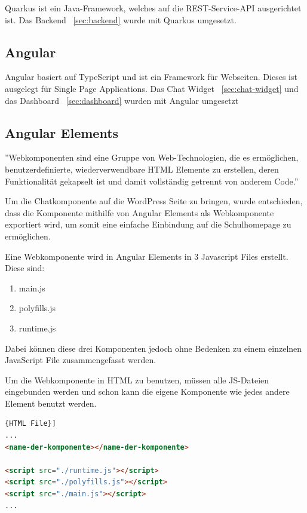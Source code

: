 Quarkus ist ein Java-Framework, welches auf die REST-Service-API ausgerichtet ist.
Das Backend ~\ref{sec:backend} wurde mit Quarkus umgesetzt.

\subsection{Angular}

Angular basiert auf TypeScript und ist ein Framework für Webseiten.
Dieses ist ausgelegt für Single Page Applications.
Das Chat Widget ~\ref{sec:chat-widget} und das Dashboard ~\ref{sec:dashboard} wurden mit Angular umgesetzt

\subsection{Angular Elements}\label{subsec:angular-elements}

''Webkomponenten sind eine Gruppe von Web-Technologien, die es ermöglichen, benutzerdefinierte, wiederverwendbare HTML Elemente zu erstellen, deren Funktionalität gekapselt ist und damit vollständig getrennt von anderem Code.''\cite{webcomponents}

Um die Chatkomponente auf die WordPress Seite zu bringen, wurde entschieden, dass die Komponente mithilfe von Angular Elements als Webkomponente exportiert wird, um somit eine einfache Einbindung auf die Schulhomepage zu ermöglichen.

Eine Webkomponente wird in Angular Elements in 3 Javascript Files erstellt.
Diese sind:

\begin{enumerate}
    \item main.js
    \item polyfills.js
    \item runtime.js
\end{enumerate}

Dabei können diese drei Komponenten jedoch ohne Bedenken zu einem einzelnen JavaScript File zusammengefasst werden.

Um die Webkomponente in HTML zu benutzen, müssen alle JS-Dateien eingebunden werden und schon kann die eigene Komponente wie jedes andere Element benutzt werden.

\begin{lstlisting}[language=html,label={lst:webcomponent},caption={HTML File}]{HTML File}]
...
<name-der-komponente></name-der-komponente>

<script src="./runtime.js"></script>
<script src="./polyfills.js"></script>
<script src="./main.js"></script>
...
\end{lstlisting}


